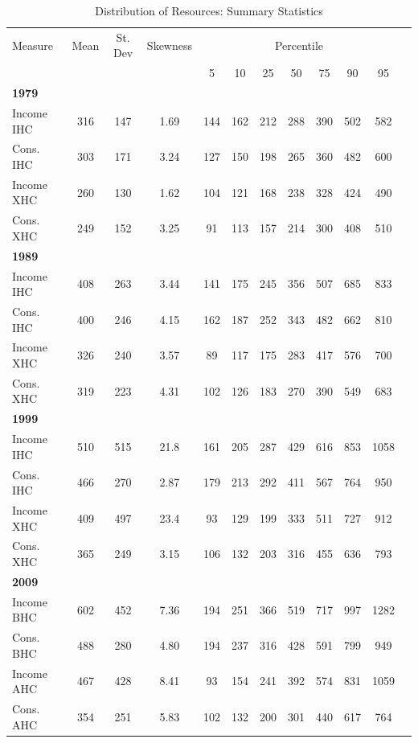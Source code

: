 \begin{table}[bp!]
\caption{Distribution of Resources: Summary Statistics}
\centering
\begin{tabular}{lccccccccccc}
\hline\hline 	
Measure &  Mean & St. Dev  & Skewness &\multicolumn{7}{c}{Percentile} \\
 & & & & 5 & 10 & 25 & 50 & 75 & 90 & 95 \\
\hline
\multicolumn{10}{l}{\textbf{1979}}  \\
Income IHC & 316 & 147 &  1.69 & 144 & 162 & 212 & 288 & 390 & 502 & 582 \\
Cons. IHC &303&171 & 3.24& 127&150&198&265&360&482&600 \\
Income XHC &260&130&1.62&104&121&168&238&328&424&490 \\
Cons. XHC &249&152&3.25&91&113&157&214&300&408&510 \\
\hline
\multicolumn{10}{l}{\textbf{1989}}  \\
Income IHC & 408&263&3.44&141&175&245&356&507&685&833 \\
Cons. IHC 	& 400&246&4.15&162&187&252&343&482&662&810 \\
Income XHC  		& 326&240&3.57&89&117&175&283&417&576&700 \\
Cons. XHC  	& 319&223&4.31&102&126&183&270&390&549&683 \\
\hline
\multicolumn{10}{l}{\textbf{1999}}  \\
Income IHC & 510&515&21.8&161&205&287&429&616&853&1058 \\
Cons. IHC & 466&270&2.87&179&213&292&411&567&764&950 \\
Income XHC & 409&497&23.4&93&129&199&333&511&727&912 \\
Cons. XHC &365&249&3.15&106&132&203&316&455&636&793 \\
\hline
\multicolumn{10}{l}{\textbf{2009}}  \\
Income BHC & 602&452&7.36&194&251&366&519&717&997&1282 \\
Cons. BHC &488&280&4.80&194&237&316&428&591&799&949 \\
Income AHC &467&428&8.41&93&154&241&392&574&831&1059 \\
Cons. AHC &354&251&5.83&102&132&200&301&440&617&764 \\
\hline\hline
\end{tabular}
\label{table:prctile}
\end{table}



